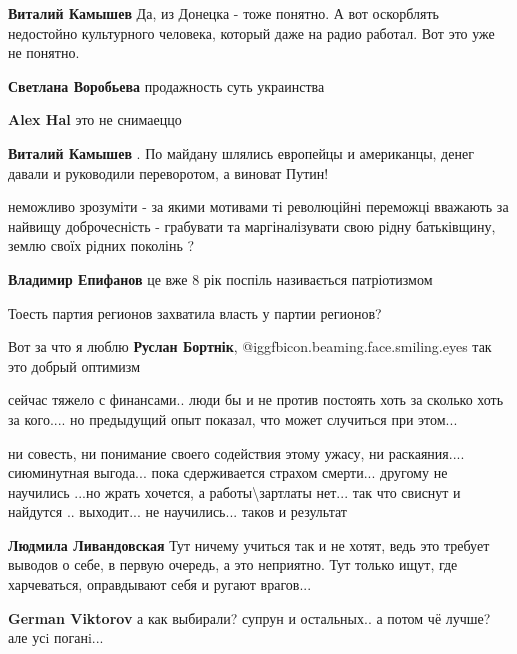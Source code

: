 \begin{itemize}
\begin{itemize}
\textbf{Виталий Камышев} Да, из Донецка - тоже понятно. А вот оскорблять недостойно культурного человека, который даже на радио работал. Вот это уже не понятно.

\textbf{Светлана Воробьева} продажность суть украинства

\textbf{Alex Hal} это не снимаеццо

\textbf{Виталий Камышев} . По майдану шлялись европейцы и американцы, денег давали и руководили переворотом, а виноват Путин!
\end{itemize} %


неможливо зрозуміти - за якими мотивами ті революційні переможці вважають за
найвищу доброчесність - грабувати та маргіналізувати свою рідну батьківщину,
землю своїх рідних поколінь ?

\begin{itemize} %
\textbf{Владимир Епифанов} це вже 8 рік поспіль називається патріотизмом
\end{itemize} %

Тоесть партия регионов захватила власть у партии регионов?

Вот за что я люблю \textbf{Руслан Бортнік},  @igg{fbicon.beaming.face.smiling.eyes}  так это добрый оптимизм


сейчас тяжело с финансами.. люди бы и не против постоять хоть за сколько хоть за
кого.... но предыдущий опыт показал, что может случиться при этом...

ни совесть, ни понимание своего содействия этому ужасу, ни раскаяния....
сиюминутная выгода... пока сдерживается страхом смерти...
другому не научились ...но жрать хочется, а работы\textbackslash зартлаты нет... так что свиснут и найдутся ..
выходит... не научились... таков и результат

\begin{itemize} %
\textbf{Людмила Ливандовская} Тут ничему учиться так и не хотят, ведь это требует выводов о себе, в первую очередь, а это неприятно. Тут только ищут, где харчеваться, оправдывают себя и ругают врагов...

\textbf{German Viktorov} а как выбирали? супрун и остальных.. а потом чё лучше?
але усi поганi...
\end{itemize} %


\end{itemize}
